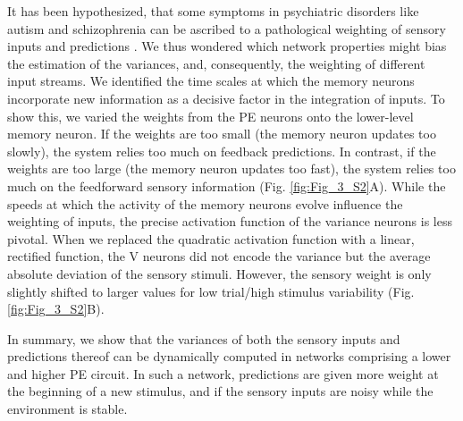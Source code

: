 \documentclass[10pt,a4paper]{article}
\begin{document}
It has been hypothesized, that some symptoms in psychiatric disorders like autism and schizophrenia can be ascribed to a pathological weighting of sensory inputs and predictions \citep{yon2021precision}. We thus wondered which network properties might bias the estimation of the variances, and, consequently, the weighting of different input streams. We identified the time scales at which the memory neurons incorporate new information as a decisive factor in the integration of inputs. To show this, we varied the weights from the PE neurons onto the lower-level memory neuron. If the weights are too small (the memory neuron updates too slowly), the system relies too much on feedback predictions. In contrast, if the weights are too large (the memory neuron updates too fast), the system relies too much on the feedforward sensory information (Fig. \ref{fig:Fig_3_S2}A). While the speeds at which the activity of the memory neurons evolve influence the weighting of inputs, the precise activation function of the variance neurons is less pivotal. When we replaced the quadratic activation function with a linear, rectified function, the V neurons did not encode the variance but the average absolute deviation of the sensory stimuli. However, the sensory weight is only slightly shifted to larger values for low trial/high stimulus variability (Fig. \ref{fig:Fig_3_S2}B). 

In summary, we show that the variances of both the sensory inputs and predictions thereof can be dynamically computed in networks comprising a lower and higher PE circuit. In such a network, predictions are given more weight at the beginning of a new stimulus, and if the sensory inputs are noisy while the environment is stable. 
\end{document}
